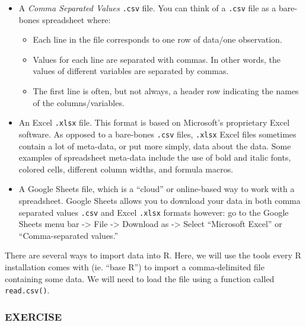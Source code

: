 \documentclass[]{book}
\providecommand{\tightlist}{%
  \setlength{\itemsep}{0pt}\setlength{\parskip}{0pt}}
\begin{document}
\begin{itemize}
\tightlist
\item
  A \emph{Comma Separated Values} \texttt{.csv} file. You can think of a \texttt{.csv} file as a bare-bones spreadsheet where:

  \begin{itemize}
  \tightlist
  \item
    Each line in the file corresponds to one row of data/one observation.\\
  \item
    Values for each line are separated with commas. In other words, the values of different variables are separated by commas.\\
  \item
    The first line is often, but not always, a header row indicating the names of the columns/variables.\\
  \end{itemize}
\item
  An Excel \texttt{.xlsx} file. This format is based on Microsoft's proprietary Excel software. As opposed to a bare-bones \texttt{.csv} files, \texttt{.xlsx} Excel files sometimes contain a lot of meta-data, or put more simply, data about the data. Some examples of spreadsheet meta-data include the use of bold and italic fonts, colored cells, different column widths, and formula macros.\\
\item
  A Google Sheets file, which is a ``cloud'' or online-based way to work with a spreadsheet. Google Sheets allows you to download your data in both comma separated values \texttt{.csv} and Excel \texttt{.xlsx} formats however: go to the Google Sheets menu bar -\textgreater{} File -\textgreater{} Download as -\textgreater{} Select ``Microsoft Excel'' or ``Comma-separated values.''
\end{itemize}

There are several ways to import data into R. Here, we will use the tools every R installation comes with (ie. ``base R'') to import a comma-delimited file containing some data. We will need to load the file using a function called \texttt{read.csv()}.

\hypertarget{exercise-9}{%
\subsubsection*{EXERCISE}\label{exercise-9}}
\end{document}
